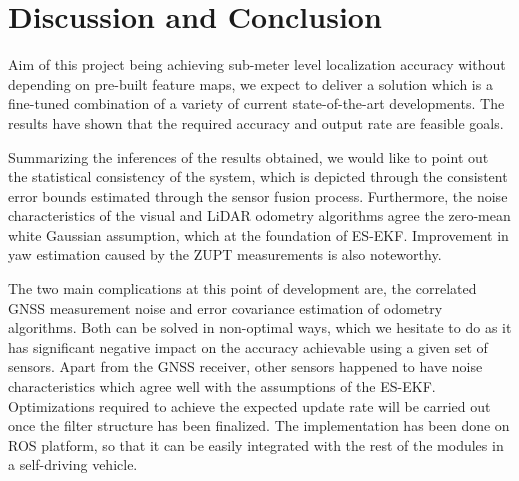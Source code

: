 \chapter{Discussion and Conclusion}
Aim of this project being achieving sub-meter level localization accuracy without depending on pre-built feature maps, we expect to deliver a solution which is a fine-tuned combination of a variety of current state-of-the-art developments. The results have shown that the required accuracy and output rate are feasible goals. 

Summarizing the inferences of the results obtained, we would like to point out the statistical consistency of the system, which is depicted through the consistent error bounds estimated through the sensor fusion process. Furthermore, the noise characteristics of the visual and \gls{LiDAR} odometry algorithms agree the zero-mean white Gaussian assumption, which at the foundation of \gls{ES-EKF}. Improvement in yaw estimation caused by the \gls{ZUPT} measurements is also noteworthy. 

The two main complications at this point of development are, the correlated \gls{GNSS} measurement noise and error covariance estimation of odometry algorithms. Both can be solved in non-optimal ways, which we hesitate to do as it has significant negative impact on the accuracy achievable using a given set of sensors. Apart from the \gls{GNSS} receiver, other sensors happened to have noise characteristics which agree well with the assumptions of the \gls{ES-EKF}. Optimizations required to achieve the expected update rate will be carried out once the filter structure has been finalized. The implementation has been done on \gls{ROS} platform, so that it can be easily integrated with the rest of the modules in a self-driving vehicle.

